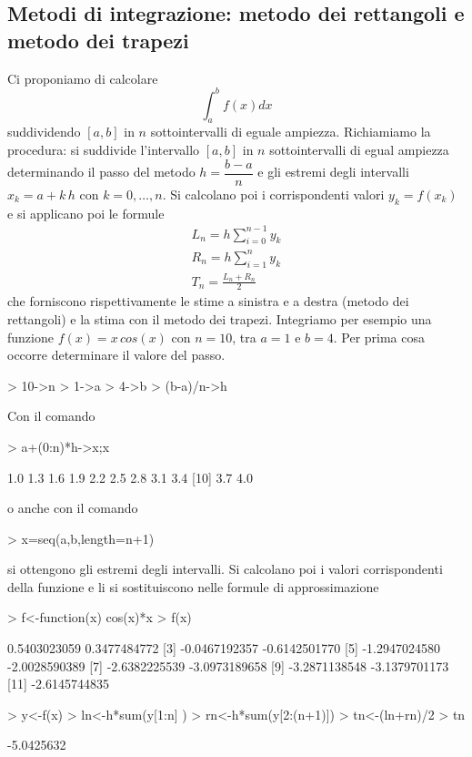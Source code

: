 \documentclass[onecolumn,11pt]{book}
\begin{document}
\subsection{Metodi di integrazione: metodo dei rettangoli e metodo dei trapezi}
Ci proponiamo di calcolare $$\int_a^b f(x)dx$$ suddividendo $[a,b]$ in $n$ sottointervalli di eguale ampiezza. Richiamiamo la procedura:  si suddivide l'intervallo $[a,b]$ in $n$ sottointervalli di egual ampiezza determinando il passo del metodo
$h=\dfrac{b-a}{n}$
e gli estremi degli intervalli
$x_k=a+ k\, h$ con $k=0,\ldots,n$. Si calcolano poi i corrispondenti valori  $y_k=f(x_k)$ e si applicano poi le formule
\begin{eqnarray*}
L_n=h \sum_{i=0}^{n-1} y_k\\
R_n=h \sum_{i=1}^{n} y_k\\
T_n=\frac{L_n+R_n}{2}\end{eqnarray*}
che forniscono rispettivamente le stime a sinistra e a destra (metodo dei rettangoli) e la stima con il metodo dei trapezi.
Integriamo per esempio  una funzione $f(x)=x\, cos(x)$ con $n=10$, tra $a=1$ e $b=4$. Per prima cosa occorre determinare  il valore del passo.
\begin{Schunk}
\begin{Sinput}
> 10->n
> 1->a
> 4->b
> (b-a)/n->h
\end{Sinput}
\end{Schunk}
Con il comando
\begin{Schunk}
\begin{Sinput}
> a+(0:n)*h->x;x
\end{Sinput}
\begin{Soutput}
 [1] 1.0 1.3 1.6 1.9 2.2 2.5 2.8 3.1 3.4
[10] 3.7 4.0
\end{Soutput}
\end{Schunk}
o anche con il comando
\begin{Schunk}
\begin{Sinput}
> x=seq(a,b,length=n+1)
\end{Sinput}
\end{Schunk}
si ottengono gli estremi degli intervalli. Si calcolano poi i valori corrispondenti della funzione e li si sostituiscono nelle formule di approssimazione
\begin{Schunk}
\begin{Sinput}
> f<-function(x) cos(x)*x
> f(x)
\end{Sinput}
\begin{Soutput}
 [1]  0.5403023059  0.3477484772
 [3] -0.0467192357 -0.6142501770
 [5] -1.2947024580 -2.0028590389
 [7] -2.6382225539 -3.0973189658
 [9] -3.2871138548 -3.1379701173
[11] -2.6145744835
\end{Soutput}
\begin{Sinput}
> y<-f(x)
> ln<-h*sum(y[1:n] )
> rn<-h*sum(y[2:(n+1)])
> tn<-(ln+rn)/2
> tn
\end{Sinput}
\begin{Soutput}
[1] -5.0425632
\end{Soutput}
\end{Schunk}
\end{document}
